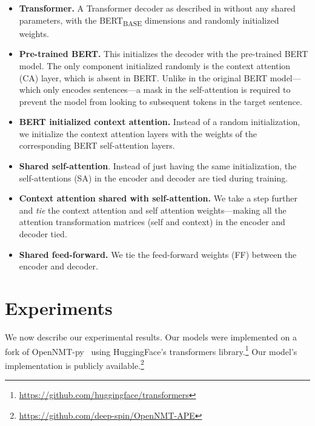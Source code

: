 \begin{itemize}
    \item \textbf{Transformer.} A Transformer decoder as described in
          \citet{vaswani2017attention} without any shared parameters,
          with the BERT\textsubscript{BASE} dimensions and randomly
          initialized weights.
    \item \textbf{Pre-trained BERT.} This initializes the decoder with
          the pre-trained BERT model. The only component initialized randomly
          is the context attention (CA) layer, which is absent in BERT. Unlike
          in the original BERT model---which only encodes sentences---a mask in
          the self-attention is required to prevent the model from looking to
          subsequent tokens in the target sentence.
    \item \textbf{ BERT initialized context attention.} Instead of a
          random initialization, we initialize the context attention layers
          with the weights of the corresponding BERT self-attention layers.
    \item \textbf{Shared self-attention}. Instead of just having the same
          initialization, the self-attentions (SA) in the encoder and decoder
          are tied during training.
    \item \textbf{Context attention shared with self-attention.} We take
          a step further and \emph{tie} the context attention and self
          attention weights---making all the attention transformation matrices
          (self and context) in the encoder and decoder tied.
    \item \textbf{Shared feed-forward.} We tie the feed-forward weights
          (FF) between the encoder and decoder.
\end{itemize}

\section{Experiments} \label{sec:experiments}

We now describe our experimental results. Our models were implemented
on a fork of OpenNMT-py~\citep{klein2017opennmt} using HuggingFace's
transformers
library.\footnote{\url{https://github.com/huggingface/transformers}}
Our model's implementation is publicly
available.\footnote{\url{https://github.com/deep-spin/OpenNMT-APE}}

